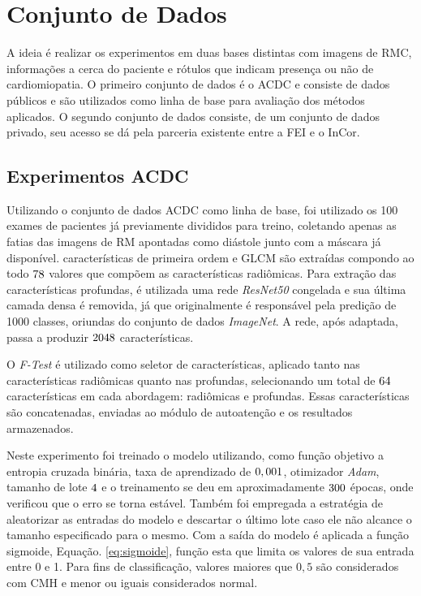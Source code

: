 \section{Conjunto de Dados} 
\label{sec:cap5_conj_dados}

A ideia é realizar os experimentos em duas bases distintas com imagens de \gls{RMC}, informações a cerca do paciente e rótulos que indicam presença ou não de cardiomiopatia. O primeiro conjunto de dados é o \gls{ACDC} e consiste de dados públicos e são utilizados como linha de base para avaliação dos métodos aplicados. O segundo conjunto de dados consiste, de um conjunto de dados privado, seu acesso se dá pela parceria existente entre a \gls{FEI} e o \gls{InCor}.

\subsection{Experimentos ACDC}
\label{subsec:cap5_experimentos_acdc}

Utilizando o conjunto de dados \gls{ACDC} como linha de base, foi utilizado os 100 exames de pacientes já previamente divididos para treino, coletando apenas as fatias das imagens de RM apontadas como diástole junto com a máscara já disponível. características de primeira ordem e \gls{GLCM} são extraídas compondo ao todo $78$ valores que compõem as características radiômicas. Para extração das características profundas, é utilizada uma rede \textit{ResNet50} congelada e sua última camada densa é removida, já que originalmente é responsável pela predição de 1000 classes, oriundas do conjunto de dados \textit{ImageNet}. A rede, após adaptada, passa a produzir $2048$ características.

O \textit{F-Test} é utilizado como seletor de características, aplicado tanto nas características radiômicas quanto nas profundas, selecionando um total de $64$ características em cada abordagem: radiômicas e profundas. Essas características são concatenadas, enviadas ao módulo de autoatenção e os resultados armazenados.

Neste experimento foi treinado o modelo utilizando, como função objetivo a entropia cruzada binária, taxa de aprendizado de $0,001$, otimizador \textit{Adam}, tamanho de lote $4$ e o treinamento se deu em aproximadamente $300$ épocas, onde verificou que o erro se torna estável. Também foi empregada a estratégia de aleatorizar as entradas do modelo e descartar o último lote caso ele não alcance o tamanho especificado para o mesmo. Com a saída do modelo é aplicada a função sigmoide, Equação. \ref{eq:sigmoide}, função esta que limita os valores de sua entrada entre 0 e 1. Para fins de classificação, valores maiores que $0,5$ são considerados com \gls{CMH} e menor ou iguais considerados normal.

